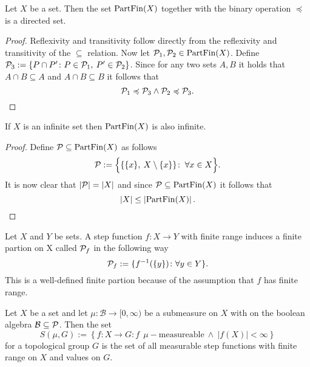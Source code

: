 \begin{thm}\label{thm:algdirected}
  Let $X$ be a set. Then the set ${\rm PartFin}(X)$ together with the binary operation $\preccurlyeq$ is a directed set.
\end{thm}

\begin{proof}
  Reflexivity and transitivity follow directly from the reflexivity and transitivity of the $\subseteq$ relation.
  Now let $\P_1, \P_2 \in {\rm PartFin}(X)$. Define $\P_3 := \{ P \cap P' \colon P \in \P_1, \:P' \in \P_2 \}$.
  Since for any two sets $A, B$ it holds that $A \cap B \subseteq A$ and $A \cap B \subseteq B$ it follows that
  \begin{equation*}
    \P_1 \preccurlyeq \P_3 \land \P_2 \preccurlyeq \P_3.
  \end{equation*}
\end{proof}

\begin{rem}\label{rem:partfinsze}
  If $X$ is an infinite set then ${\rm PartFin}(X)$ is also infinite.
\end{rem}

\begin{proof}
  Define $\P \subseteq {\rm PartFin}(X)$ as follows
  \begin{equation*}
    \P := \Big\{ \{ \{x\}, \: X\setminus\{x\}\}\colon \: \forall x \in X \Big\}.
  \end{equation*}
  It is now clear that $\left| \P \right| = \left| X \right|$ and since $\P \subseteq {\rm PartFin}(X)$ it follows that 
  \begin{equation*}
    \left| X \right| \leq \left| {\rm PartFin}(X) \right|.
  \end{equation*}
\end{proof}

\begin{defin}
  Let $X$ and $Y$ be sets. A step function $f\colon X \to Y$ with finite range induces a finite partion on X called $\P_f$ in the following way
  \begin{equation*}
    \P_f := \{f^{-1}(\{y\})\colon \forall y \in Y\}.
  \end{equation*}
  This is a well-defined finite partion because of the assumption that $f$ has finite range.
\end{defin}

\begin{defin}
  Let $X$ be a set and let $\mu\colon \mathcal{B} \to [0, \infty)$ be a submeasure on $X$ with on the boolean algebra $\mathcal{B} \subseteq \P$. Then the set
  \begin{equation*}
    S(\mu, G) := \left\{ f: X \to G\colon f \:\:\mu-\text{measureable} \: \land \: \left| f(X) \right| < \infty \right\}
  \end{equation*}
  for a topological group $G$ is the set of all measurable step functions with finite range on $X$ and values on $G$.
\end{defin}

